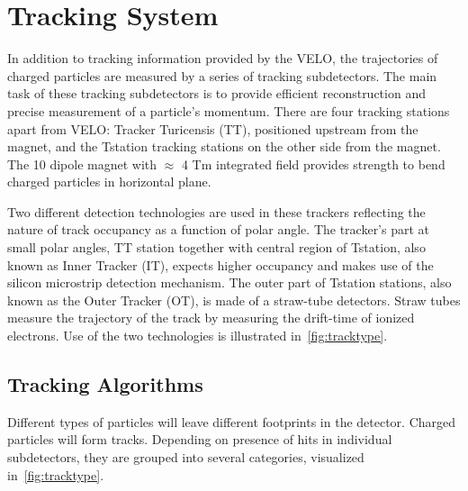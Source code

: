 \section{Tracking System }
\label{tracksys}
In addition to tracking information provided by the \Gls{VELO}, the trajectories of charged particles are measured by a series of tracking subdetectors. The main task of these tracking subdetectors is to provide efficient reconstruction and precise measurement of a particle's momentum. There are four tracking stations apart from \Gls{VELO}: Tracker Turicensis (\Gls{TT}), positioned upstream from the magnet, and the \Gls{Tstation} tracking stations on the other side from the magnet. The 10 \m dipole magnet with $\approx$ 4 Tm integrated field provides strength to bend charged particles in horizontal plane.

 Two different detection technologies are used in these trackers reflecting the nature of track occupancy as a function of polar angle. The tracker's part at small polar angles, \Gls{TT} station together with central region of \Gls{Tstation}, also known as Inner Tracker (\Gls{IT}), expects higher occupancy and makes use of the silicon microstrip detection mechanism. The outer part of \Gls{Tstation} stations, also known as the Outer Tracker (\Gls{OT}), is made of a straw-tube detectors. Straw tubes measure the trajectory of the track by measuring the drift-time of ionized electrons. Use of the two technologies is illustrated in~\autoref{fig:tracktype}. 

\subsection{Tracking Algorithms} 
Different types of particles will leave different footprints in the detector. Charged particles will form tracks. Depending on presence of hits in individual subdetectors, they are grouped into several categories, visualized in~\autoref{fig:tracktype}.

